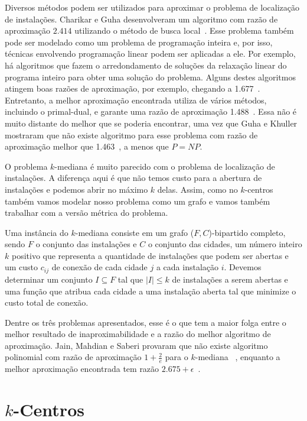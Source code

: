 \documentclass[12pt]{article}
\newcommand{\NP}{\mathit{NP}}
\begin{document}
Diversos métodos podem ser utilizados para aproximar o problema de localização de instalações. Charikar e Guha desenvolveram um algoritmo com razão de aproximação $2.414$ utilizando o método de busca local~\cite{Charikar&Guha'05}.  Esse problema também pode ser modelado como um problema de programação inteira e, por isso, técnicas envolvendo programação linear podem ser aplicadas a ele.  Por exemplo, há algoritmos que fazem o arredondamento de soluções da relaxação linear do programa inteiro para obter uma solução do problema.  Alguns destes algoritmos atingem boas razões de aproximação, por exemplo, chegando a 1.677~\cite{Byrka&Aardal'10}. Entretanto, a melhor aproximação encontrada utiliza de vários métodos, incluindo o primal-dual, e garante uma razão de aproximação 1.488~\cite{LI'13}. Essa não é muito distante do melhor que se poderia encontrar, uma vez que Guha e Khuller mostraram que não existe algoritmo para esse problema com razão de aproximação melhor que 1.463~\cite{GUHA1999228}, a menos que $P = \NP$.

O problema $k$-mediana é muito parecido com o problema de localização de instalações. A diferença aqui é que não temos custo para a abertura de instalações e podemos abrir no máximo $k$ delas. Assim, como no $k$-centros também vamos modelar nosso problema como um grafo e vamos também trabalhar com a versão métrica do problema.

Uma instância do $k$-mediana consiste em um grafo ($F,C$)-bipartido completo, sendo $F$ o conjunto das instalações e $C$ o conjunto das cidades, um número inteiro $k$ positivo que representa a quantidade de instalações que podem ser abertas e um custo $c_{ij}$ de conexão de cada cidade $j$ a cada instalação $i$. Devemos determinar um conjunto $I \subseteq F$ tal que $|I| \leq k$ de instalações a serem abertas e uma função que atribua cada cidade a uma instalação aberta tal que minimize o custo total de conexão.

Dentre os três problemas apresentados, esse é o que tem a maior folga entre o melhor resultado de inaproximabilidade e a razão do melhor algoritmo de aproximação. Jain, Mahdian e Saberi provaram que não existe algoritmo polinomial com razão de aproximação $1+ \frac{2}{e}$ para o $k$-mediana ~\cite{JMS'02}, enquanto a melhor aproximação encontrada tem razão $2.675 + \epsilon$~\cite{BPRST'17}.

\newpage
\section{$k$-Centros}
\end{document}
